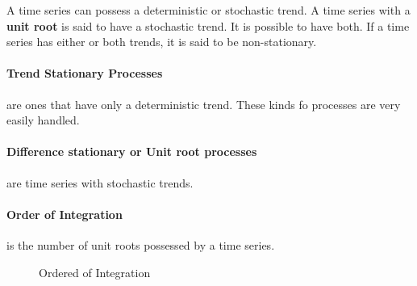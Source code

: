 \documentclass[11pt]{article}
\begin{document}
A time series can possess a deterministic or stochastic trend. A time series with a \textbf{unit root} is said to have a stochastic trend. It is possible to have both. If a time series has either or both trends, it is said to be non-stationary.

\paragraph{Trend Stationary Processes} are ones that have only a deterministic trend. These kinds fo processes are very easily handled.

\paragraph{Difference stationary or Unit root processes} are time series with stochastic trends.

\paragraph{Order of Integration} is the number of unit roots possessed by a time series.

\begin{figure}[h]
    \centering
    \qquad
    \caption{Ordered of Integration}%
    \label{fig:i0 i2}%
\end{figure}
\end{document}

